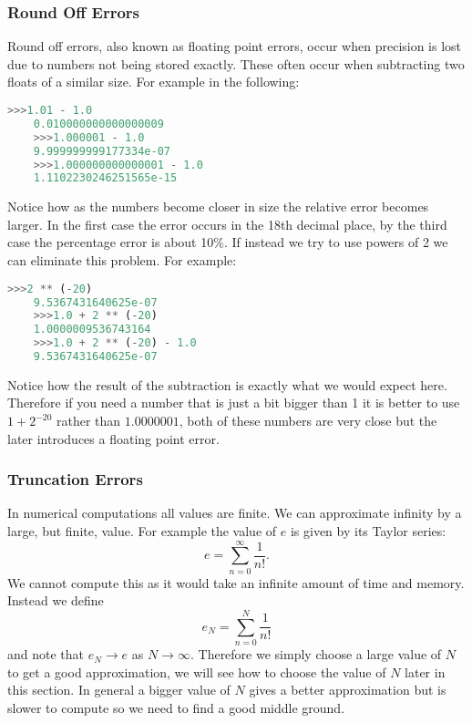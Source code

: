 \documentclass[a4paper]{article}
\begin{document}
    \subsubsection{Round Off Errors}
    Round off errors, also known as floating point errors, occur when precision is lost due to numbers not being stored exactly.
    These often occur when subtracting two floats of a similar size.
    For example in the following:
    \begin{lstlisting}[language=python]
    >>>1.01 - 1.0
    0.010000000000000009  
    >>>1.000001 - 1.0
    9.999999999177334e-07
    >>>1.000000000000001 - 1.0
    1.1102230246251565e-15
    \end{lstlisting}
    Notice how as the numbers become closer in size the relative error becomes larger.
    In the first case the error occurs in the 18th decimal place, by the third case the percentage error is about 10\%.
    If instead we try to use powers of 2 we can eliminate this problem.
    For example:
    \begin{lstlisting}[language=python]
    >>>2 ** (-20)
    9.5367431640625e-07
    >>>1.0 + 2 ** (-20)
    1.0000009536743164
    >>>1.0 + 2 ** (-20) - 1.0
    9.5367431640625e-07
    \end{lstlisting}
    Notice how the result of the subtraction is exactly what we would expect here.
    Therefore if you need a number that is just a bit bigger than 1 it is better to use \(1 + 2^{-20}\) rather than \(1.0000001\), both of these numbers are very close but the later introduces a floating point error.
    
    \subsubsection{Truncation Errors}\label{sec:truncation errors}
    In numerical computations all values are finite.
    We can approximate infinity by a large, but finite, value.
    For example the value of \(e\) is given by its Taylor series:
    \[e = \sum_{n = 0}^\infty \frac{1}{n!}.\]
    We cannot compute this as it would take an infinite amount of time and memory.
    Instead we define
    \[e_N = \sum_{n = 0}^N \frac{1}{n!}\]
    and note that \(e_N \to e\) as \(N \to \infty\).
    Therefore we simply choose a large value of \(N\) to get a good approximation, we will see how to choose the value of \(N\) later in this section.
    In general a bigger value of \(N\) gives a better approximation but is slower to compute so we need to find a good middle ground.
    
\end{document}
